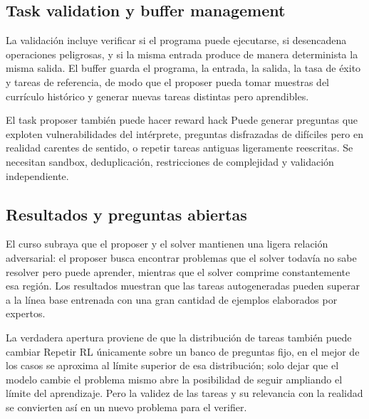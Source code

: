 \subsection{Task validation y buffer management}


La validación incluye verificar si el programa puede ejecutarse, si desencadena operaciones peligrosas, y si la misma entrada produce de manera determinista la misma salida. El buffer guarda el programa, la entrada, la salida, la tasa de éxito y tareas de referencia, de modo que el proposer pueda tomar muestras del currículo histórico y generar nuevas tareas distintas pero aprendibles.

\begin{warningbox}{El task proposer también puede hacer reward hack}
Puede generar preguntas que exploten vulnerabilidades del intérprete, preguntas disfrazadas de difíciles pero en realidad carentes de sentido, o repetir tareas antiguas ligeramente reescritas. Se necesitan sandbox, deduplicación, restricciones de complejidad y validación independiente.
\end{warningbox}

\subsection{Resultados y preguntas abiertas}


El curso subraya que el proposer y el solver mantienen una ligera relación adversarial: el proposer busca encontrar problemas que el solver todavía no sabe resolver pero puede aprender, mientras que el solver comprime constantemente esa región. Los resultados muestran que las tareas autogeneradas pueden superar a la línea base entrenada con una gran cantidad de ejemplos elaborados por expertos.

\begin{importantbox}{La verdadera apertura proviene de que la distribución de tareas también puede cambiar}
Repetir RL únicamente sobre un banco de preguntas fijo, en el mejor de los casos se aproxima al límite superior de esa distribución; solo dejar que el modelo cambie el problema mismo abre la posibilidad de seguir ampliando el límite del aprendizaje. Pero la validez de las tareas y su relevancia con la realidad se convierten así en un nuevo problema para el verifier.
\end{importantbox}

